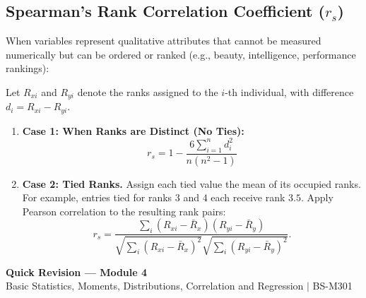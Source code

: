 \documentclass[12pt,a4paper]{article}
\begin{document}
\subsection{Spearman's Rank Correlation Coefficient ($r_s$)}
When variables represent qualitative attributes that cannot be measured numerically but can be ordered or ranked (e.g., beauty, intelligence, performance rankings):
\begin{tcolorbox}[defbox, title={\textbf{Spearman's Rank Correlation Formula}}]
Let $R_{xi}$ and $R_{yi}$ denote the ranks assigned to the $i$-th individual, with difference $d_i = R_{xi} - R_{yi}$.
\begin{enumerate}[leftmargin=*, itemsep=3pt]
  \item \textbf{Case 1: When Ranks are Distinct (No Ties):}
  \begin{equation}
    r_s = 1 - \frac{6 \displaystyle\sum_{i=1}^n d_i^2}{n(n^2 - 1)}
  \end{equation}
  \item \textbf{Case 2: Tied Ranks.} Assign each tied value the mean of its occupied ranks. For example, entries tied for ranks $3$ and $4$ each receive rank $3.5$. Apply Pearson correlation to the resulting rank pairs:
  \begin{equation}
    r_s =
    \frac{\sum_i (R_{xi}-\bar R_x)(R_{yi}-\bar R_y)}
         {\sqrt{\sum_i (R_{xi}-\bar R_x)^2}\sqrt{\sum_i (R_{yi}-\bar R_y)^2}}.
  \end{equation}
\end{enumerate}
\end{tcolorbox}

\newpage
\begin{center}
  {\large\bfseries\color{myred} Quick Revision --- Module 4}\\[3pt]
  {\small\color{mydark} Basic Statistics, Moments, Distributions, Correlation and Regression $|$ BS-M301}
\end{center}
\noindent{\color{myred}\rule{\linewidth}{1.2pt}}
\vspace{1pt}
\end{document}
